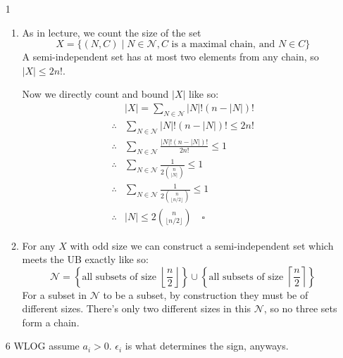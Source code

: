 \documentclass[12pt]{article}
\begin{document}
\begin{enumerate}
    \item[1] \begin{enumerate}
            \item As in lecture, we count the size of the set
                  \[X=\{(N, C) \mid N \in \mathcal{N}, \text{$C$ is a maximal chain, and } N \in C\}\]
                  A semi-independent set has at most two elements from any chain, so $|X| \le 2n!$.

                  Now we directly count and bound $|X|$ like so:
                  \begin{align*}
                                   & |X| = \sum_{N \in \mathcal{N}} |N|!(n-|N|)!                              \\
                      \therefore{} & \sum_{N \in \mathcal{N}} |N|!(n-|N|)! \le 2n!                            \\
                      \therefore{} & \sum_{N \in \mathcal{N}} \frac{|N|!(n-|N|)!}{2n!} \le 1                  \\
                      \therefore{} & \sum_{N \in \mathcal{N}} \frac{1}{2\binom{n}{|N|}} \le 1                 \\
                      \therefore{} & \sum_{N \in \mathcal{N}} \frac{1}{2\binom{n}{\lfloor n/2 \rfloor}} \le 1 \\
                      \therefore{} & |N| \le 2\binom{n}{\lfloor n/2 \rfloor}\quad\square
                  \end{align*}

                  \pagebreak

            \item For any $X$ with odd size we can construct a semi-independent set
                  which meets the UB exactly like so:
                  \[\mathcal{N}=\left\{\text{all subsets of size $\left\lfloor \frac{n}{2} \right\rfloor$}\right\}
                      \cup \left\{\text{all subsets of size $\left\lceil \frac{n}{2} \right\rceil$}\right\}\]
                  For a subset in $\mathcal{N}$ to be a subset, by
                  construction they must be of different sizes.
                  There's only two different sizes in this $\mathcal{N}$,
                  so no three sets form a chain.
        \end{enumerate}

    \item[6] WLOG assume $a_i>0$.
        $\epsilon_i$ is what determines the sign, anyways.


\end{enumerate}
\end{document}
